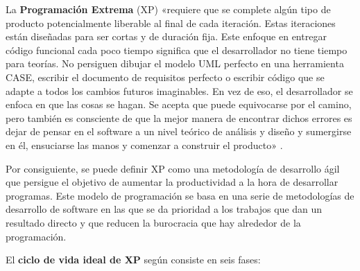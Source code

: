 La \textbf{Programación Extrema} (\acs{XP}) «requiere que se complete algún tipo de producto potencialmente liberable al final de cada iteración. Estas iteraciones están diseñadas para ser cortas y de duración fija. Este enfoque en entregar código funcional cada poco tiempo significa que el desarrollador no tiene tiempo para teorías. No persiguen dibujar el modelo UML perfecto en una herramienta CASE, escribir el documento de requisitos perfecto o escribir código que se adapte a todos los cambios futuros imaginables. En vez de eso, el desarrollador se enfoca en que las cosas se hagan. Se acepta que puede equivocarse por el camino, pero también es consciente de que la mejor manera de encontrar dichos errores es dejar de pensar en el software a un nivel teórico de análisis y diseño y sumergirse en él, ensuciarse las manos y comenzar a construir el producto» \cite{scrum}.

Por consiguiente, se puede definir \acs{XP} como una metodología de desarrollo ágil que persigue el objetivo de aumentar la productividad a la hora de desarrollar programas. Este modelo de programación se basa en una serie de metodologías de desarrollo de software en las que se da prioridad a los trabajos que dan un resultado directo y que reducen la burocracia que hay alrededor de la programación.

El \textbf{ciclo de vida ideal de \acs{XP}} según \cite{scrum2} consiste en seis fases:

